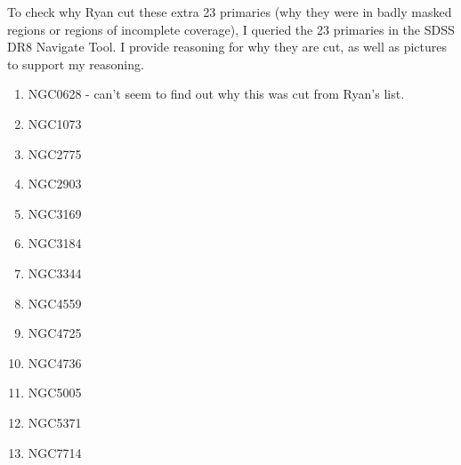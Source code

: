 \documentclass[10pt,letterpaper]{article}
\begin{document}
To check why Ryan cut these extra 23 primaries (why they were in badly masked regions or regions of incomplete coverage), I queried the 23 primaries in the SDSS DR8 Navigate Tool. I provide reasoning for why they are cut, as well as pictures to support my reasoning.\\

\begin{enumerate}
\item NGC0628 - can't seem to find out why this was cut from Ryan's list.
\item NGC1073
\item NGC2775
\item NGC2903
\item NGC3169
\item NGC3184
\item NGC3344
\item NGC4559
\item NGC4725
\item NGC4736
\item NGC5005
\item NGC5371
\item NGC7714
\end{enumerate}
\end{document}
